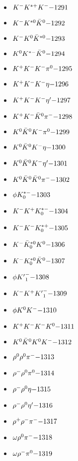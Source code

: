 \begin{multicols}{3}
\begin{itemize}
 \item $ K^{-} K^{*+} K^{-} \hfill{-1291}$
 \item $ K^{-} K^{*0} \bar{K}^{0} \hfill{-1292}$
 \item $ K^{-} K^{0} \bar{K}^{*0} \hfill{-1293}$
 \item $ K^{0} K^{*-} \bar{K}^{0} \hfill{-1294}$
 \item $ K^{+} K^{-} K^{-} \pi^{0} \hfill{-1295}$
 \item $ K^{+} K^{-} K^{-} \eta \hfill{-1296}$
 \item $ K^{+} K^{-} K^{-} {\eta^{\prime}} \hfill{-1297}$
 \item $ K^{+} K^{-} \bar{K}^{0} \pi^{-} \hfill{-1298}$
 \item $ K^{0} \bar{K}^{0} K^{-} \pi^{0} \hfill{-1299}$
 \item $ K^{0} \bar{K}^{0} K^{-} \eta \hfill{-1300}$
 \item $ K^{0} \bar{K}^{0} K^{-} {\eta^{\prime}} \hfill{-1301}$
 \item $ K^{0} \bar{K}^{0} \bar{K}^{0} \pi^{-} \hfill{-1302}$
 \item $ \phi K_{0}^{*-} \hfill{-1303}$
 \item $ K^{-} K^{+} K_{0}^{*-} \hfill{-1304}$
 \item $ K^{-} K^{-} K_{0}^{*+} \hfill{-1305}$
 \item $ K^{-} \bar{K}_{0}^{*0} K^{0} \hfill{-1306}$
 \item $ K^{-} K_{0}^{*0} \bar{K}^{0} \hfill{-1307}$
 \item $ \phi {K^{\prime}}_{1}^{-} \hfill{-1308}$
 \item $ K^{-} K^{+} {K^{\prime}}_{1}^{-} \hfill{-1309}$
 \item $ \phi K^{0} K^{-} \hfill{-1310}$
 \item $ K^{+} K^{-} K^{-} K^{0} \hfill{-1311}$
 \item $ K^{0} \bar{K}^{0} K^{0} K^{-} \hfill{-1312}$
 \item $ \rho^{0} \rho^{0} \pi^{-} \hfill{-1313}$
 \item $ \rho^{-} \rho^{0} \pi^{0} \hfill{-1314}$
 \item $ \rho^{-} \rho^{0} \eta \hfill{-1315}$
 \item $ \rho^{-} \rho^{0} {\eta^{\prime}} \hfill{-1316}$
 \item $ \rho^{+} \rho^{-} \pi^{-} \hfill{-1317}$
 \item $ \omega \rho^{0} \pi^{-} \hfill{-1318}$
 \item $ \omega \rho^{-} \pi^{0} \hfill{-1319}$

\end{itemize}
\end{multicols}
